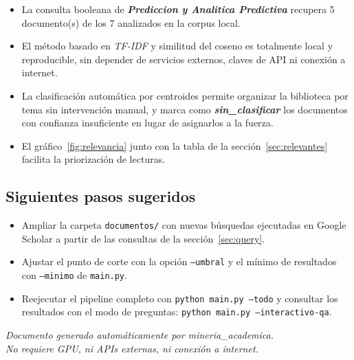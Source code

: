 \documentclass[11pt,a4paper]{article}
\newcommand{\tema}[1]{\textbf{\textit{#1}}}
\begin{document}
\begin{itemize}
\setlength{\itemsep}{4pt}
  \item La consulta booleana de \tema{ Prediccion y Analitica Predictiva } recupera
        5 documento(s) de los 7
        analizados en la corpus local.
  \item El método basado en \textit{TF-IDF} y similitud del coseno es
        totalmente local y reproducible, sin depender de servicios externos,
        claves de API ni conexión a internet.
  \item La clasificación automática por centroides permite organizar la
        biblioteca por tema sin intervención manual, y marca como
        \tema{sin\_clasificar} los documentos con confianza insuficiente en
        lugar de asignarlos a la fuerza.
  \item El gráfico~\ref{fig:relevancia} junto con la tabla de la
        sección~\ref{sec:relevantes} facilita la priorización de lecturas.
\end{itemize}

\subsection*{Siguientes pasos sugeridos}

\begin{itemize}
\setlength{\itemsep}{3pt}
  \item Ampliar la carpeta \texttt{documentos/} con nuevas búsquedas
        ejecutadas en Google Scholar a partir de las consultas de la
        sección~\ref{sec:query}.
  \item Ajustar el punto de corte con la opción \texttt{--umbral} y el mínimo
        de resultados con \texttt{--minimo} de \texttt{main.py}.
  \item Reejecutar el pipeline completo con \texttt{python main.py --todo}
        y consultar los resultados con el modo de preguntas:
        \texttt{python main.py --interactivo-qa}.
\end{itemize}

\vfill
\begin{center}
\small
\textit{Documento generado automáticamente por mineria\_academica.\\
No requiere GPU, ni APIs externas, ni conexión a internet.}
\end{center}
\end{document}
